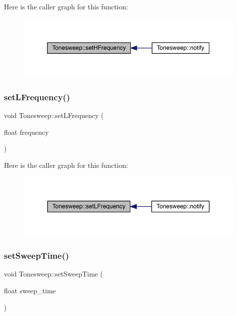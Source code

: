 Here is the caller graph for this function\+:\nopagebreak
\begin{figure}[H]
\begin{center}
\leavevmode
\includegraphics[width=350pt]{class_tonesweep_aa4f50b9008e57267144ed3ac20ed977e_icgraph}
\end{center}
\end{figure}
\mbox{\label{class_tonesweep_a1c3ce513e5c8cff6f7489643a622f254}} 
\subsubsection{\texorpdfstring{set\+L\+Frequency()}{setLFrequency()}}
{\footnotesize\ttfamily void Tonesweep\+::set\+L\+Frequency (\begin{DoxyParamCaption}\item[{float}]{frequency }\end{DoxyParamCaption})}

Here is the caller graph for this function\+:\nopagebreak
\begin{figure}[H]
\begin{center}
\leavevmode
\includegraphics[width=350pt]{class_tonesweep_a1c3ce513e5c8cff6f7489643a622f254_icgraph}
\end{center}
\end{figure}
\mbox{\label{class_tonesweep_af9a80c36bb303972c91fe12cddcb1a49}} 
\subsubsection{\texorpdfstring{set\+Sweep\+Time()}{setSweepTime()}}
{\footnotesize\ttfamily void Tonesweep\+::set\+Sweep\+Time (\begin{DoxyParamCaption}\item[{float}]{sweep\+\_\+time }\end{DoxyParamCaption})}

